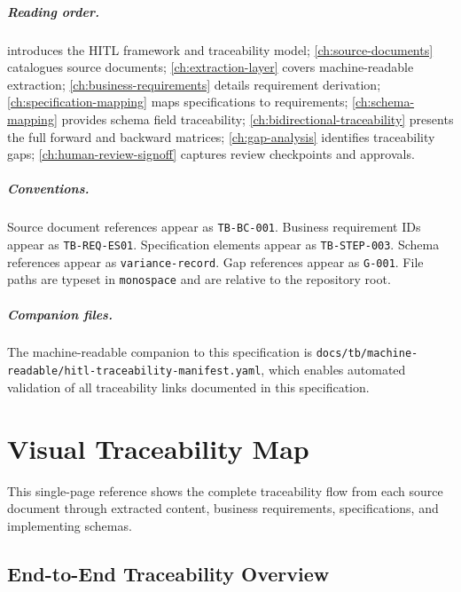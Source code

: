 \documentclass[11pt,a4paper,twoside]{report}
\newcommand{\srcref}[1]{\texttt{#1}}
\newcommand{\reqref}[1]{\texttt{#1}}
\newcommand{\specref}[1]{\texttt{#1}}
\newcommand{\schemaref}[1]{\texttt{#1}}
\newcommand{\gapref}[1]{\texttt{#1}}
\begin{document}
\paragraph{Reading order.}  introduces the HITL framework
and traceability model; \cref{ch:source-documents} catalogues source
documents; \cref{ch:extraction-layer} covers machine-readable extraction;
\cref{ch:business-requirements} details requirement derivation;
\cref{ch:specification-mapping} maps specifications to requirements;
\cref{ch:schema-mapping} provides schema field traceability;
\cref{ch:bidirectional-traceability} presents the full forward and
backward matrices; \cref{ch:gap-analysis} identifies traceability gaps;
\cref{ch:human-review-signoff} captures review checkpoints and approvals.

\paragraph{Conventions.} Source document references appear as
\srcref{TB-BC-001}. Business requirement IDs appear as \reqref{TB-REQ-ES01}.
Specification elements appear as \specref{TB-STEP-003}. Schema references
appear as \schemaref{variance-record}. Gap references appear as
\gapref{G-001}. File paths are typeset in \texttt{monospace} and are
relative to the repository root.

\paragraph{Companion files.} The machine-readable companion to this
specification is \texttt{docs/tb/machine-readable/hitl-traceability-manifest.yaml},
which enables automated validation of all traceability links documented
in this specification.

\tableofcontents
\chapter*{Visual Traceability Map}
\label{ch:visual-map}

This single-page reference shows the complete traceability flow from each source document
through extracted content, business requirements, specifications, and implementing schemas.

\section*{End-to-End Traceability Overview}
\end{document}

